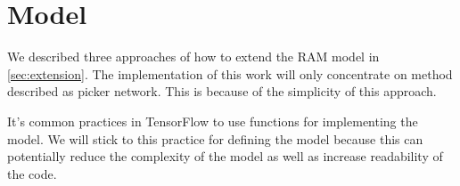 
%
%


\section{Model}
\label{sec:design_model}

We described three approaches of how to extend the RAM model
in \autoref{sec:extension}. The implementation of this work
will only concentrate on method described as picker network.
This is because of the simplicity of this approach.


It's common practices in TensorFlow to use functions for implementing the model.
We will stick to this practice for defining the model because this can
potentially reduce the complexity of the model as well as
increase readability of the code.


